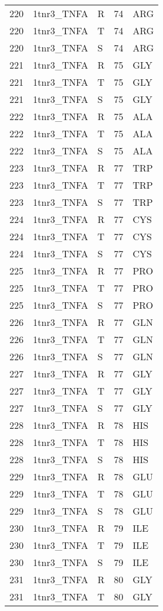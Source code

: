 \begin{longtable}[l]{l|l|l|l|l}
	220 & 1tnr3_TNFA & R & 74 & ARG \\
	220 & 1tnr3_TNFA & T & 74 & ARG \\
	220 & 1tnr3_TNFA & S & 74 & ARG \\
	221 & 1tnr3_TNFA & R & 75 & GLY \\
	221 & 1tnr3_TNFA & T & 75 & GLY \\
	221 & 1tnr3_TNFA & S & 75 & GLY \\
	222 & 1tnr3_TNFA & R & 75 & ALA \\
	222 & 1tnr3_TNFA & T & 75 & ALA \\
	222 & 1tnr3_TNFA & S & 75 & ALA \\
	223 & 1tnr3_TNFA & R & 77 & TRP \\
	223 & 1tnr3_TNFA & T & 77 & TRP \\
	223 & 1tnr3_TNFA & S & 77 & TRP \\
	224 & 1tnr3_TNFA & R & 77 & CYS \\
	224 & 1tnr3_TNFA & T & 77 & CYS \\
	224 & 1tnr3_TNFA & S & 77 & CYS \\
	225 & 1tnr3_TNFA & R & 77 & PRO \\
	225 & 1tnr3_TNFA & T & 77 & PRO \\
	225 & 1tnr3_TNFA & S & 77 & PRO \\
	226 & 1tnr3_TNFA & R & 77 & GLN \\
	226 & 1tnr3_TNFA & T & 77 & GLN \\
	226 & 1tnr3_TNFA & S & 77 & GLN \\
	227 & 1tnr3_TNFA & R & 77 & GLY \\
	227 & 1tnr3_TNFA & T & 77 & GLY \\
	227 & 1tnr3_TNFA & S & 77 & GLY \\
	228 & 1tnr3_TNFA & R & 78 & HIS \\
	228 & 1tnr3_TNFA & T & 78 & HIS \\
	228 & 1tnr3_TNFA & S & 78 & HIS \\
	229 & 1tnr3_TNFA & R & 78 & GLU \\
	229 & 1tnr3_TNFA & T & 78 & GLU \\
	229 & 1tnr3_TNFA & S & 78 & GLU \\
	230 & 1tnr3_TNFA & R & 79 & ILE \\
	230 & 1tnr3_TNFA & T & 79 & ILE \\
	230 & 1tnr3_TNFA & S & 79 & ILE \\
	231 & 1tnr3_TNFA & R & 80 & GLY \\
	231 & 1tnr3_TNFA & T & 80 & GLY \\

\end{longtable}
